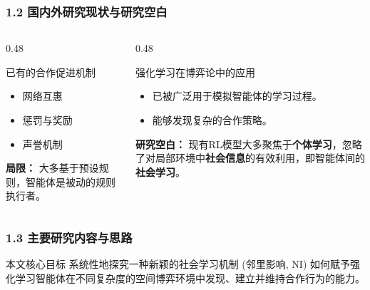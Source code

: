 \documentclass[UTF8]{beamer}
\begin{document}
\begin{frame}
    \frametitle{1.2 国内外研究现状与研究空白}
    \begin{columns}[T]
        \begin{column}{0.48\textwidth}
            \begin{block}{已有的合作促进机制}
                \begin{itemize}
                    \item 网络互惠
                    \item 惩罚与奖励
                    \item 声誉机制
                \end{itemize}
                \pause
                \textbf{局限：} 大多基于预设规则，智能体是被动的规则执行者。
            \end{block}
        \end{column}
        \begin{column}{0.48\textwidth}
            \begin{block}{强化学习在博弈论中的应用}
                \begin{itemize}
                    \item 已被广泛用于模拟智能体的学习过程。
                    \item 能够发现复杂的合作策略。
                \end{itemize}
                \pause
                 \textbf{研究空白：} 现有RL模型大多聚焦于\textbf{个体学习}，忽略了对局部环境中\textbf{社会信息}的有效利用，即智能体间的\textbf{社会学习}。
            \end{block}
        \end{column}
    \end{columns}
\end{frame}

\begin{frame}
    \frametitle{1.3 主要研究内容与思路}
    \begin{center}
    \end{center}
    
    \begin{block}{本文核心目标}
    系统性地探究一种新颖的社会学习机制 (邻里影响, NI) 如何赋予强化学习智能体在不同复杂度的空间博弈环境中发现、建立并维持合作行为的能力。
    \end{block}
\end{frame}
\end{document}
